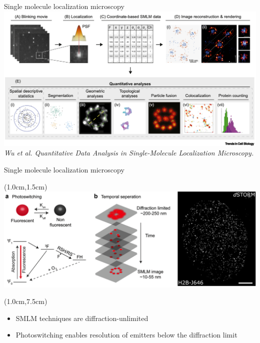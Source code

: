 \documentclass{beamer}					%
\begin{document}
\begin{frame}{Single molecule localization microscopy}
\includegraphics[width=\textwidth]{Apps}
\textit{Wu et al. Quantitative Data Analysis in Single-Molecule Localization Microscopy.}
\end{frame}


\begin{frame}{Single molecule localization microscopy}
\begin{textblock*}{13cm}(1.0cm,1.5cm)
\includegraphics[width=\textwidth]{Intro.png}
\end{textblock*}
\begin{textblock*}{\textwidth}(1.0cm,7.5cm)
\begin{itemize}
\item SMLM techniques are diffraction-unlimited
\item Photoswitching enables resolution of emitters below the diffraction limit
\end{itemize}
\end{textblock*}
\end{frame}
\end{document}
